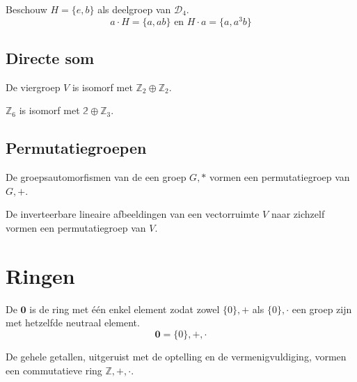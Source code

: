 \documentclass[main.tex]{subfiles}
\begin{document}
\begin{vb}
  Beschouw $H = \{e,b\}$ als deelgroep van $\mathcal{D}_{4}$.
  \[ a\cdot H = \{a,ab\} \text{ en } H \cdot a = \{ a,a^{3}b \} \]
\end{vb}

\subsection{Directe som}
\label{sec:directe-som}

\begin{vb}
  De viergroep $V$ is isomorf met $\mathbb{Z}_{2} \oplus \mathbb{Z}_{2}$.
\end{vb}

\begin{vb}
  $\mathbb{Z}_{6}$ is isomorf met $\mathbb{2} \oplus \mathbb{Z}_{3}$.
\end{vb}

\subsection{Permutatiegroepen}
\label{sec:permutatiegroepen}

\begin{vb}
  De groepsautomorfismen van de een groep $G,*$ vormen een permutatiegroep van $G,+$.
\end{vb}

\begin{vb}
  De inverteerbare lineaire afbeeldingen van een vectorruimte $V$ naar zichzelf vormen een permutatiegroep van $V$.
\end{vb}

\section{Ringen}
\label{sec:ringen}

\begin{de}
  De  $\boldsymbol{0}$ is de ring met \'e\'en enkel element zodat zowel $\{0\},+$ als $\{0\},\cdot$ een groep zijn met hetzelfde neutraal element.
  \[ \boldsymbol{0} = \{0\},+,\cdot \]
  \commj
\end{de}

\begin{vb}
  De gehele getallen, uitgeruist met de optelling en de vermenigvuldiging, vormen een commutatieve ring $\mathbb{Z},+,\cdot$.
  \commj
\end{vb}
\end{document}
